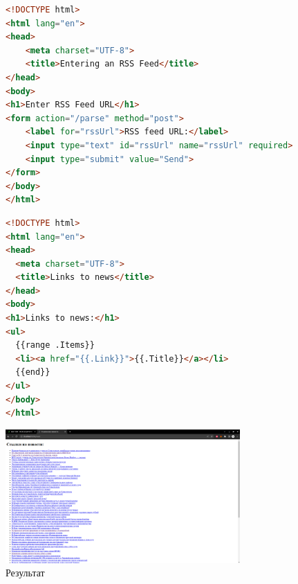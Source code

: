 \documentclass[a4paper, 14pt]{extarticle}
\begin{document}
\newpage
\begin{figure}[!htb]
\begin{lstlisting}[language={HTML},caption={form.html},label={lst:code8}]
<!DOCTYPE html>
<html lang="en">
<head>
    <meta charset="UTF-8">
    <title>Entering an RSS Feed</title>
</head>
<body>
<h1>Enter RSS Feed URL</h1>
<form action="/parse" method="post">
    <label for="rssUrl">RSS feed URL:</label>
    <input type="text" id="rssUrl" name="rssUrl" required>
    <input type="submit" value="Send">
</form>
</body>
</html>
\end{lstlisting}
\end{figure}

\newpage
\begin{figure}[!htb]
\begin{lstlisting}[language={HTML},caption={news.html},label={lst:code9}]
<!DOCTYPE html>
<html lang="en">
<head>
  <meta charset="UTF-8">
  <title>Links to news</title>
</head>
<body>
<h1>Links to news:</h1>
<ul>
  {{range .Items}}
  <li><a href="{{.Link}}">{{.Title}}</a></li>
  {{end}}
</ul>
</body>
</html>
\end{lstlisting}
\end{figure}



\begin{figure}[!htb]
	\centering
	\includegraphics[width=0.8\textwidth]{result.png}
\caption{Результат}
\label{fig:img1}
\end{figure}
\end{document}
